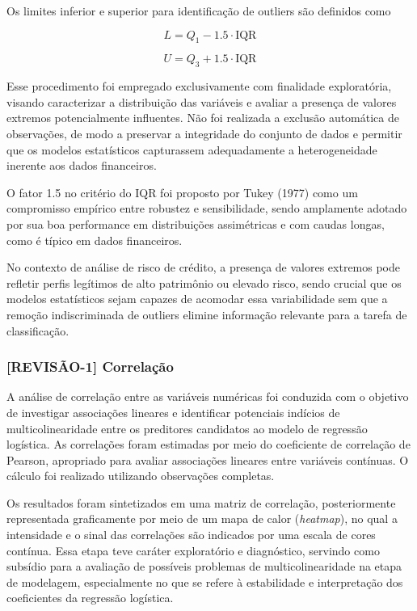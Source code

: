 \documentclass[
  brazilian,
  12pt,
  letterpaper,
  DIV=11,
  numbers=noendperiod]{scrartcl}
\begin{document}
Os limites inferior e superior para identificação de outliers são
definidos como

\begin{equation}
L = Q_1 - 1.5 \cdot \mathrm{IQR}
\label{eq:lower_bound}
\end{equation}

\begin{equation}
U = Q_3 + 1.5 \cdot \mathrm{IQR}
\label{eq:upper_bound}
\end{equation}

Esse procedimento foi empregado exclusivamente com finalidade
exploratória, visando caracterizar a distribuição das variáveis e
avaliar a presença de valores extremos potencialmente influentes. Não
foi realizada a exclusão automática de observações, de modo a preservar
a integridade do conjunto de dados e permitir que os modelos
estatísticos capturassem adequadamente a heterogeneidade inerente aos
dados financeiros.

O fator 1.5 no critério do IQR foi proposto por Tukey (1977) como um
compromisso empírico entre robustez e sensibilidade, sendo amplamente
adotado por sua boa performance em distribuições assimétricas e com
caudas longas, como é típico em dados financeiros.

No contexto de análise de risco de crédito, a presença de valores
extremos pode refletir perfis legítimos de alto patrimônio ou elevado
risco, sendo crucial que os modelos estatísticos sejam capazes de
acomodar essa variabilidade sem que a remoção indiscriminada de outliers
elimine informação relevante para a tarefa de classificação.

\subsubsection{{[}REVISÃO-1{]}
Correlação}\label{revisuxe3o-1-correlauxe7uxe3o}

A análise de correlação entre as variáveis numéricas foi conduzida com o
objetivo de investigar associações lineares e identificar potenciais
indícios de multicolinearidade entre os preditores candidatos ao modelo
de regressão logística. As correlações foram estimadas por meio do
coeficiente de correlação de Pearson, apropriado para avaliar
associações lineares entre variáveis contínuas. O cálculo foi realizado
utilizando observações completas.

Os resultados foram sintetizados em uma matriz de correlação,
posteriormente representada graficamente por meio de um mapa de calor
(\emph{heatmap}), no qual a intensidade e o sinal das correlações são
indicados por uma escala de cores contínua. Essa etapa teve caráter
exploratório e diagnóstico, servindo como subsídio para a avaliação de
possíveis problemas de multicolinearidade na etapa de modelagem,
especialmente no que se refere à estabilidade e interpretação dos
coeficientes da regressão logística.
\end{document}
